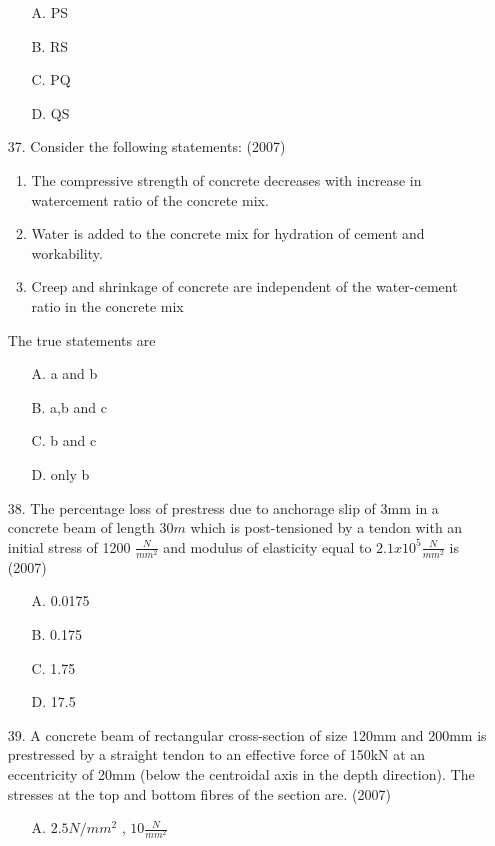 \documentclass[journal]{IEEEtran}
\begin{document}
\begin{enumerate}
    \begin{enumerate}
        \item [A.] PS
        \item [B.] RS
        \item [C.] PQ
        \item [D.] QS
    \end{enumerate}
  \item[37.]  Consider the following statements: \hfill (2007)
  \begin{enumerate}
    \item The compressive strength of concrete decreases with increase in watercement ratio of the concrete mix.
    \item Water is added to the concrete mix for hydration of cement and
    workability. 
    \item Creep and shrinkage of concrete are independent of the water-cement ratio
    in the concrete mix
  \end{enumerate}
  The true statements are 
  \begin{enumerate}
    \item [A.] a and b
    \item [B.] a,b and c
    \item [C.] b and c
    \item [D.] only b
  \end{enumerate}
  \item [38.] The percentage loss of prestress due to anchorage slip of 3mm in a concrete beam
  of length $30m$ which is post-tensioned by a tendon with an initial stress of 1200 $\frac{N}{mm^2}$
  and modulus of elasticity equal to $2.1 x 10^5\frac{N}{mm^2}$ is \hfill (2007)
  \begin{enumerate}
    \item [A.] 0.0175 
    \item [B.] 0.175 
    \item [C.] 1.75 
    \item [D.] 17.5 
  \end{enumerate}
  \item [39.] A concrete beam of rectangular cross-section of size 120mm  and 200mm
   is prestressed by a straight tendon to an effective force of 150kN at an
  eccentricity of 20mm (below the centroidal axis in the depth direction). The
  stresses at the top and bottom fibres of the section are. \hfill (2007)
  \begin{enumerate}
    \item [A.] $2.5N/mm^2$ , $10\frac{N}{mm^2}$ 

\end{enumerate}
\end{enumerate}
\end{document}
